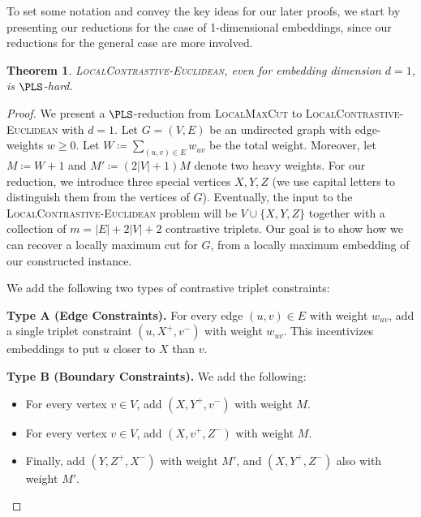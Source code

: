 \documentclass{article}
\theoremstyle{definition}  %
\theoremstyle{plain}
\newtheorem{theorem}{Theorem}
\numberwithin{observation}{section}
\numberwithin{claim}{section}
\numberwithin{fact}{section}
\numberwithin{lemma}{section}
\numberwithin{proposition}{section}
\numberwithin{theorem}{section}
\numberwithin{corollary}{section}
\numberwithin{definition}{section}
\theoremstyle{plain}
\begin{document}
To set some notation and convey the key ideas for our later proofs, we start by presenting our reductions for the case of 1-dimensional embeddings, since our reductions for the general case are more involved.

\begin{theorem}\label{thm:local-contrastive-1d}
\textsc{LocalContrastive-Euclidean}, even for embedding dimension $d=1$, is $\PLS$-hard.
\end{theorem}

\begin{proof}
    We present a $\PLS$-reduction from \textsc{LocalMaxCut} to \textsc{LocalContrastive-Euclidean} with $d=1$. Let $G = (V, E)$ be an undirected graph with edge-weights $w\ge0$. Let $W\coloneq \sum_{(u,v) \in E} w_{uv}$ be the total weight. Moreover, let $M \coloneq W + 1$ and $M' \coloneq (2|V| + 1)M$ denote two heavy weights. For our reduction, we introduce three special vertices $X, Y, Z$ (we use capital letters to distinguish them from the vertices of $G$). Eventually, the input to the \textsc{LocalContrastive-Euclidean} problem will be $V\cup\{X,Y,Z\}$ together with a collection of $m=|E|+2|V|+2$ contrastive triplets. Our goal is to show how we can recover a locally maximum cut for $G$, from a locally maximum embedding of our constructed instance.
    
    We add the following two types of contrastive triplet constraints:


\textbf{Type A (Edge Constraints).} For every edge $(u, v) \in E$ with weight $w_{uv}$, add a single triplet constraint $(u, X^+, v^-)$ with weight $w_{uv}$. This incentivizes embeddings to put $u$ closer to $X$ than $v$.

\textbf{Type B (Boundary Constraints).} We add the following:
\begin{itemize}
\vspace{-0.2cm}
    \item For every vertex $v \in V$, add $(X, Y^+, v^-)$ with weight $M$.
    \vspace{-0.2cm}
    \item For every vertex $v \in V$, add $(X, v^+, Z^-)$ with weight $M$.
    \vspace{-0.2cm}
    \item Finally, add $(Y, Z^+, X^-)$ with weight $M'$, and $(X, Y^+, Z^-)$ also with weight $M'$.
\end{itemize}
\vspace{-0.2cm}


\end{proof}
\end{document}
